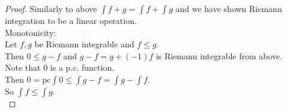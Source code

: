 \documentclass[12pt]{article}
\begin{document}
\begin{proof}
		Similarly to above $\int f +g = \int f + \int g$ and we have shown Riemann integration to be a linear operation.\\
		
		Monotonicity: \\
		
		Let $f,g$ be Riemann integrable and $f \leq g$. \\
		Then $0 \leq g-f$ and $g-f = g + (-1)f$ is Riemann integrable from above. \\
		Note that $0$ is a p.c. function. \\
		Then $0 = \text{pc}\int 0 \leq \int g-f = \int g - \int f$. \\
		So $\int f \leq \int g$. \\		
	\end{proof}
\end{document}
